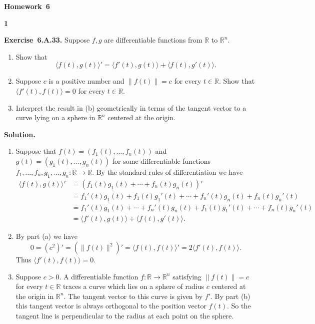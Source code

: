 \documentclass[11pt]{article}
\newcommand{\AssignmentType}{Homework} %
\newcommand{\AssignmentNumber}{6}
\newcommand{\ProblemDivider}[1]{%
  \vspace{1.0em}
  \noindent\textbf{#1}\par
  \vspace{0.35em}
}
\newcommand{\ProblemAnnounce}{\noindent}
\newcommand{\SolutionAnnounce}{\noindent\textbf{Solution.}\par\medskip}
\newcommand{\Exercise}[1]{\textbf{Exercise~#1.}\;}
\newcommand{\R}{\mathbb{R}}
\newcommand{\<}{\langle}
\renewcommand{\>}{\rangle}
\begin{document}
\begin{center}
  {\Large \textbf{\AssignmentType~\AssignmentNumber}}
\end{center}
\vspace{0.75em}

\ProblemDivider{1}

\begin{problemBox}
\ProblemAnnounce
\Exercise{6.A.33}
Suppose $f, g$ are differentiable functions from $\R$ to $\R^n$.
\begin{enumerate}
  \item[(a)] Show that
  \[\<f(t), g(t)\>' = \<f'(t), g(t)\> + \<f(t), g'(t)\>.\]
  \item[(b)] Suppose $c$ is a positive number and $\|f(t)\| = c$ for every $t \in \R$. Show that
  $\<f'(t), f(t)\> = 0$ for every $t \in \R$.
  \item[(c)] Interpret the result in (b) geometrically in terms of the tangent vector to a curve
  lying on a sphere in $\R^n$ centered at the origin.
\end{enumerate}
\end{problemBox}

\begin{solutionBox}
\SolutionAnnounce
\doublespacing

\begin{enumerate}
  \item[(a)] Suppose that $f(t) = (f_1(t), \ldots, f_n(t))$ and $g(t) = (g_1(t), \ldots, g_n(t))$ for some differentiable
  functions $f_1, \ldots, f_n, g_1, \ldots, g_n: \R \to \R$. By the standard rules of differentiation we have
  \[
  \begin{aligned}
  \<f(t), g(t)\>' &= (f_1(t)g_1(t) + \cdots + f_n(t)g_n(t))' \\
  &= f_1'(t)g_1(t) + f_1(t)g_1'(t) + \cdots + f_n'(t)g_n(t) + f_n(t)g_n'(t) \\
  &= f_1'(t)g_1(t) + \cdots + f_n'(t)g_n(t) + f_1(t)g_1'(t) + \cdots + f_n(t)g_n'(t) \\
  &= \<f'(t), g(t)\> + \<f(t), g'(t)\>.
  \end{aligned}
  \]
  
  \item[(b)] By part (a) we have
  \[
  0 = (c^2)' = (\|f(t)\|^2)' = \<f(t), f(t)\>' = 2\<f'(t), f(t)\>.
  \]
  Thus $\<f'(t), f(t)\> = 0$.
  
  \item[(c)] Suppose $c > 0$. A differentiable function $f: \R \to \R^n$ satisfying $\|f(t)\| = c$ for every
  $t \in \R$ traces a curve which lies on a sphere of radius $c$ centered at the
  origin in $\R^n$. The tangent vector to this curve is given by $f'$. By part (b)
  this tangent vector is always orthogonal to the position vector $f(t)$. So the tangent line is perpendicular to the radius at each point on the sphere.
\end{enumerate}
\end{solutionBox}
\end{document}
